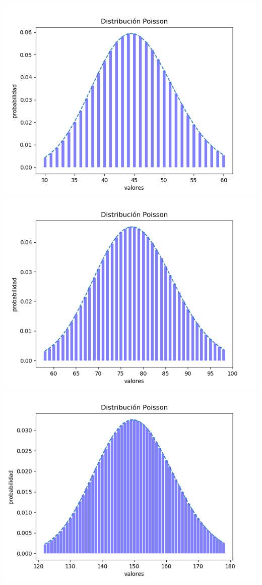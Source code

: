 \documentclass[12pt,a4paper]{article}
\begin{document}
\begin{multicols}{2}
\begin{itemize}
        \includegraphics[scale=0.5]{poisson_normal_3.png}
        \includegraphics[scale=0.5]{poisson_normal_4.png}
        \includegraphics[scale=0.5]{poisson_normal_5.png}

\end{itemize}
\end{multicols}
\end{document}
